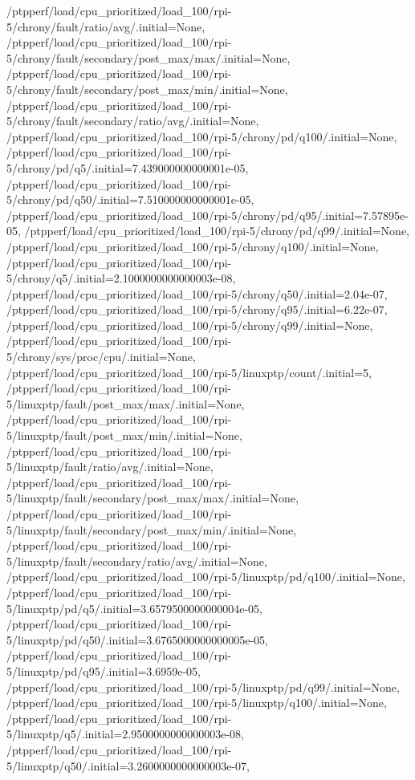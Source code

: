 {    /ptpperf/load/cpu_prioritized/load_100/rpi-5/chrony/fault/ratio/avg/.initial=None,
    /ptpperf/load/cpu_prioritized/load_100/rpi-5/chrony/fault/secondary/post_max/max/.initial=None,
    /ptpperf/load/cpu_prioritized/load_100/rpi-5/chrony/fault/secondary/post_max/min/.initial=None,
    /ptpperf/load/cpu_prioritized/load_100/rpi-5/chrony/fault/secondary/ratio/avg/.initial=None,
    /ptpperf/load/cpu_prioritized/load_100/rpi-5/chrony/pd/q100/.initial=None,
    /ptpperf/load/cpu_prioritized/load_100/rpi-5/chrony/pd/q5/.initial=7.439000000000001e-05,
    /ptpperf/load/cpu_prioritized/load_100/rpi-5/chrony/pd/q50/.initial=7.510000000000001e-05,
    /ptpperf/load/cpu_prioritized/load_100/rpi-5/chrony/pd/q95/.initial=7.57895e-05,
    /ptpperf/load/cpu_prioritized/load_100/rpi-5/chrony/pd/q99/.initial=None,
    /ptpperf/load/cpu_prioritized/load_100/rpi-5/chrony/q100/.initial=None,
    /ptpperf/load/cpu_prioritized/load_100/rpi-5/chrony/q5/.initial=2.1000000000000003e-08,
    /ptpperf/load/cpu_prioritized/load_100/rpi-5/chrony/q50/.initial=2.04e-07,
    /ptpperf/load/cpu_prioritized/load_100/rpi-5/chrony/q95/.initial=6.22e-07,
    /ptpperf/load/cpu_prioritized/load_100/rpi-5/chrony/q99/.initial=None,
    /ptpperf/load/cpu_prioritized/load_100/rpi-5/chrony/sys/proc/cpu/.initial=None,
    /ptpperf/load/cpu_prioritized/load_100/rpi-5/linuxptp/count/.initial=5,
    /ptpperf/load/cpu_prioritized/load_100/rpi-5/linuxptp/fault/post_max/max/.initial=None,
    /ptpperf/load/cpu_prioritized/load_100/rpi-5/linuxptp/fault/post_max/min/.initial=None,
    /ptpperf/load/cpu_prioritized/load_100/rpi-5/linuxptp/fault/ratio/avg/.initial=None,
    /ptpperf/load/cpu_prioritized/load_100/rpi-5/linuxptp/fault/secondary/post_max/max/.initial=None,
    /ptpperf/load/cpu_prioritized/load_100/rpi-5/linuxptp/fault/secondary/post_max/min/.initial=None,
    /ptpperf/load/cpu_prioritized/load_100/rpi-5/linuxptp/fault/secondary/ratio/avg/.initial=None,
    /ptpperf/load/cpu_prioritized/load_100/rpi-5/linuxptp/pd/q100/.initial=None,
    /ptpperf/load/cpu_prioritized/load_100/rpi-5/linuxptp/pd/q5/.initial=3.6579500000000004e-05,
    /ptpperf/load/cpu_prioritized/load_100/rpi-5/linuxptp/pd/q50/.initial=3.6765000000000005e-05,
    /ptpperf/load/cpu_prioritized/load_100/rpi-5/linuxptp/pd/q95/.initial=3.6959e-05,
    /ptpperf/load/cpu_prioritized/load_100/rpi-5/linuxptp/pd/q99/.initial=None,
    /ptpperf/load/cpu_prioritized/load_100/rpi-5/linuxptp/q100/.initial=None,
    /ptpperf/load/cpu_prioritized/load_100/rpi-5/linuxptp/q5/.initial=2.9500000000000003e-08,
    /ptpperf/load/cpu_prioritized/load_100/rpi-5/linuxptp/q50/.initial=3.2600000000000003e-07,
}
